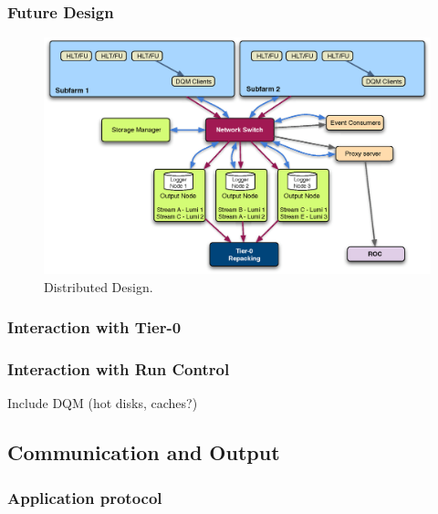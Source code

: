 \subsubsection{Future Design}

\begin{figure}[hbtp]
  \begin{center}
    \includegraphics[width=130mm]{SM_architecture_opt2.eps}
    \caption{Distributed Design.}
    \label{fig:opt2_design}
  \end{center}
\end{figure}

\subsubsection{Interaction with Tier-0}

\subsubsection{Interaction with Run Control}

Include DQM (hot disks, caches?)


\subsection{Communication and Output}

\subsubsection{Application protocol}




